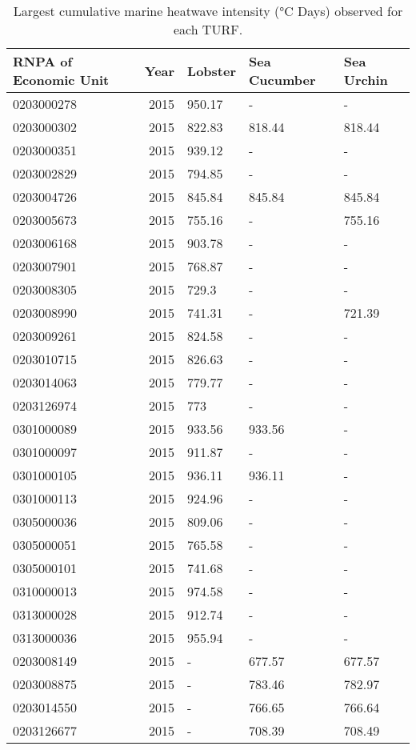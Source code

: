 \begin{table}

\caption{\label{tab:hist_max_mhw_ref_points}Largest cumulative marine heatwave intensity (°C Days) observed for each TURF.}
\centering
\begin{tabular}[t]{lrlll}
\toprule
RNPA of Economic Unit & Year & Lobster & Sea Cucumber & Sea Urchin\\
\midrule
0203000278 & 2015 & 950.17 & - & -\\
0203000302 & 2015 & 822.83 & 818.44 & 818.44\\
0203000351 & 2015 & 939.12 & - & -\\
0203002829 & 2015 & 794.85 & - & -\\
0203004726 & 2015 & 845.84 & 845.84 & 845.84\\
0203005673 & 2015 & 755.16 & - & 755.16\\
0203006168 & 2015 & 903.78 & - & -\\
0203007901 & 2015 & 768.87 & - & -\\
0203008305 & 2015 & 729.3 & - & -\\
0203008990 & 2015 & 741.31 & - & 721.39\\
0203009261 & 2015 & 824.58 & - & -\\
0203010715 & 2015 & 826.63 & - & -\\
0203014063 & 2015 & 779.77 & - & -\\
0203126974 & 2015 & 773 & - & -\\
0301000089 & 2015 & 933.56 & 933.56 & -\\
0301000097 & 2015 & 911.87 & - & -\\
0301000105 & 2015 & 936.11 & 936.11 & -\\
0301000113 & 2015 & 924.96 & - & -\\
0305000036 & 2015 & 809.06 & - & -\\
0305000051 & 2015 & 765.58 & - & -\\
0305000101 & 2015 & 741.68 & - & -\\
0310000013 & 2015 & 974.58 & - & -\\
0313000028 & 2015 & 912.74 & - & -\\
0313000036 & 2015 & 955.94 & - & -\\
0203008149 & 2015 & - & 677.57 & 677.57\\
0203008875 & 2015 & - & 783.46 & 782.97\\
0203014550 & 2015 & - & 766.65 & 766.64\\
0203126677 & 2015 & - & 708.39 & 708.49\\

\end{tabular}
\end{table}
